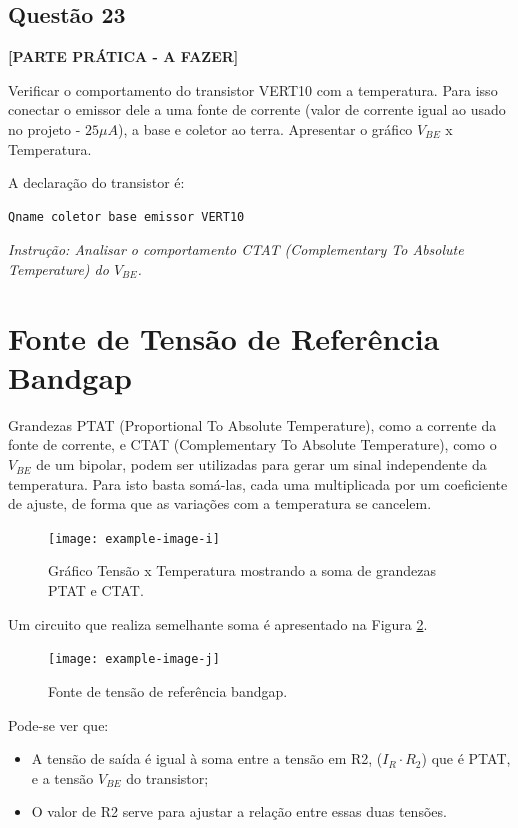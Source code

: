 \documentclass[12pt,a4paper]{article}
\begin{document}
\subsection*{Questão 23}

\textbf{[PARTE PRÁTICA - A FAZER]}

Verificar o comportamento do transistor VERT10 com a temperatura. Para isso conectar o emissor dele a uma fonte de corrente (valor de corrente igual ao usado no projeto - $25 \mu A$), a base e coletor ao terra. Apresentar o gráfico $V_{BE}$ x Temperatura.

A declaração do transistor é:
\begin{verbatim}
Qname coletor base emissor VERT10
\end{verbatim}

\textit{Instrução: Analisar o comportamento CTAT (Complementary To Absolute Temperature) do $V_{BE}$.}

\section*{Fonte de Tensão de Referência Bandgap}

Grandezas PTAT (Proportional To Absolute Temperature), como a corrente da fonte de corrente, e CTAT (Complementary To Absolute Temperature), como o $V_{BE}$ de um bipolar, podem ser utilizadas para gerar um sinal independente da temperatura. Para isto basta somá-las, cada uma multiplicada por um coeficiente de ajuste, de forma que as variações com a temperatura se cancelem.

\begin{figure}[H]
    \centering
    \texttt{[image: example-image-i]}
    \caption{Gráfico Tensão x Temperatura mostrando a soma de grandezas PTAT e CTAT.}
    \label{fig:ptat_ctat}
\end{figure}

Um circuito que realiza semelhante soma é apresentado na Figura \ref{fig:bandgap_ref}.

\begin{figure}[H]
    \centering
    \texttt{[image: example-image-j]}
    \caption{Fonte de tensão de referência bandgap.}
    \label{fig:bandgap_ref}
\end{figure}

Pode-se ver que:
\begin{itemize}
    \item A tensão de saída é igual à soma entre a tensão em R2, ($I_R \cdot R_2$) que é PTAT, e a tensão $V_{BE}$ do transistor;
    \item O valor de R2 serve para ajustar a relação entre essas duas tensões.
\end{itemize}
\end{document}
